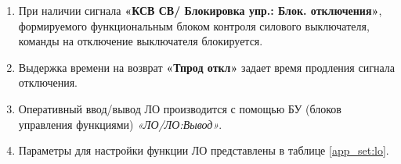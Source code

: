 \begin{enumerate}
\item
При наличии сигнала \textbf{«КСВ СВ/ Блокировка упр.: Блок. отключения»}, формируемого функциональным блоком контроля силового
выключателя, команды на отключение выключателя блокируется.

\item
Выдержка времени на возврат \textbf{«Тпрод откл»} задает время продления сигнала отключения. 

\item
Оперативный ввод/вывод ЛО производится с помощью БУ (блоков управления функциями) \textit{«ЛО/ЛО:Вывод»}.

\item
Параметры для настройки функции ЛО представлены в таблице \ref{app_set:lo}.

\end{enumerate}